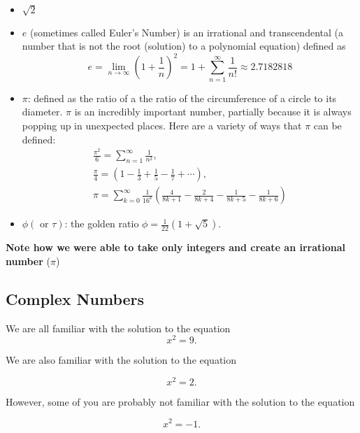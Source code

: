 \begin{itemize}
    \item $\sqrt{2}$
    \item $e$ (sometimes called Euler's Number) is an irrational and transcendental (a number that is not the root (solution) to a polynomial equation) defined as
\begin{equation}
e = \lim_{n\to \infty}\left(1+\frac{1}{n}\right)^2=1+\sum_{n=1}^\infty\frac{1}{n!}\approx 2.7182818
\end{equation}

    \item $\pi$: defined as the ratio of a the ratio of the circumference of a circle to its diameter. $\pi$ is an incredibly important number, partially because it is always popping up in unexpected places. Here are a variety of ways that $\pi$ can be defined:
\begin{eqnarray*}
\frac{\pi^2}{6} = \sum_{n=1}^{\infty}\frac{1}{n^2},\\
\frac{\pi}{4} = \left(1-\frac{1}{3}+\frac{1}{5}-\frac{1}{7}+\cdots\right),\\
\pi=\sum_{k=0}^\infty\frac{1}{16^k}\left(\frac{4}{8k+1}-\frac{2}{8k+4}-\frac{1}{8k+5}-\frac{1}{8k+6}\right)
\end{eqnarray*}

    \item $ \phi (\text{ or } \tau )$: the golden ratio $\phi=\frac{1}{22}(1+\sqrt{5})$.
\end{itemize}

\textbf{Note how we were able to take only integers and create an irrational number} ($\pi$)

\subsection{Complex Numbers}

We are all familiar with the solution to the equation
\begin{equation}
x^2=9.
\end{equation}

We are also familiar with the solution to the equation

\begin{equation}
x^2=2.
\end{equation}

However, some of you are probably not familiar with the solution to the equation

\begin{equation}
x^2=-1.
\end{equation}

